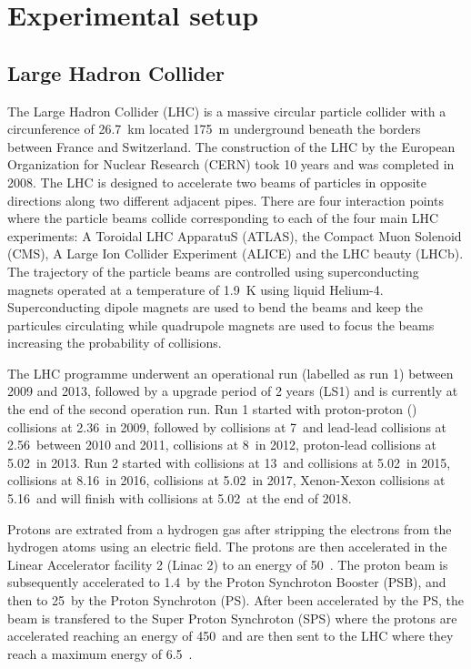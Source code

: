 \section{Experimental setup}\label{sec:Introduction_Experiment}

\subsection{Large Hadron Collider}\label{sec:Introduction_Experiment_LHC}


The Large Hadron Collider (LHC) is a massive circular particle collider with a circunference of 26.7~km located 175~m underground beneath the borders between France and Switzerland. The construction of the LHC by the European Organization for Nuclear Research (CERN) took 10 years and was completed in 2008. The LHC is designed to accelerate two beams of particles in opposite directions along two different adjacent pipes. There are four interaction points where the particle beams collide corresponding to each of the four main LHC experiments: A Toroidal LHC ApparatuS (ATLAS), the Compact Muon Solenoid (CMS), A Large Ion Collider Experiment (ALICE) and the LHC beauty (LHCb). The trajectory of the particle beams are controlled using superconducting magnets operated at a temperature of 1.9~K using liquid Helium-4. Superconducting dipole magnets are used to bend the beams and keep the particules circulating while quadrupole magnets are used to focus the beams increasing the probability of collisions.

The LHC programme underwent an operational run (labelled as run 1) between 2009 and 2013, followed by a upgrade period of 2 years (LS1) and is currently at the end of the second operation run. Run 1  started with proton-proton ({\PpPp}) collisions at 2.36~\TeV in 2009, followed by {\PpPp} collisions at 7~\TeV and lead-lead collisions at 2.56~\TeV between 2010 and 2011, {\PpPp} collisions at 8~\TeV in 2012, proton-lead collisions at 5.02~\TeV in 2013. Run 2 started with {\PpPp} collisions at 13~\TeV and {\PbPb} collisions at 5.02~\TeV in 2015, \pPb collisions at 8.16~\TeV in 2016, {\PpPp} collisions at 5.02~\TeV in 2017, Xenon-Xexon collisions at 5.16~\TeV and will finish with {\PbPb} collisions at 5.02~\TeV at the end of 2018.


Protons are extrated from a hydrogen gas after stripping the electrons from the hydrogen atoms using an electric field. The protons are then accelerated in the Linear Accelerator facility 2 (Linac 2) to an energy of 50~\MeV. The proton beam is subsequently accelerated to 1.4~\GeV by the Proton Synchroton Booster (PSB), and then to 25~\GeV by the Proton Synchroton (PS). After been accelerated by the PS, the beam is transfered to the Super Proton Synchroton (SPS) where the protons are accelerated reaching an energy of 450~\GeV and are then sent to the LHC where they reach a maximum energy of 6.5~\TeV.

